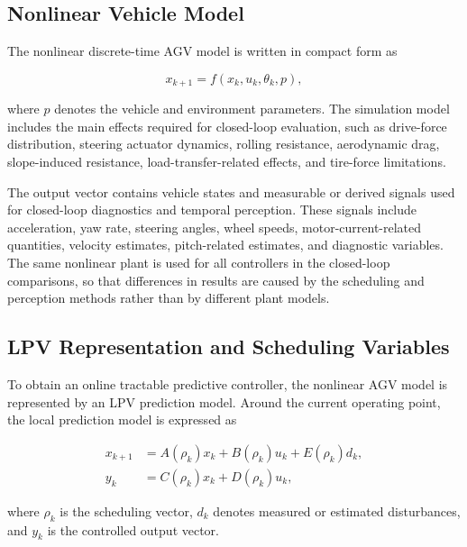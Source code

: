 \documentclass{ieeeaccess}
\begin{document}
\subsection{Nonlinear Vehicle Model}



The nonlinear discrete-time AGV model is written in compact form as

\begin{equation}
x_{k+1}=f(x_k,u_k,\theta_k,p),
\label{eq:nonlinear_model}
\end{equation}

where $p$ denotes the vehicle and environment parameters. The simulation model includes the main effects required for closed-loop evaluation, such as drive-force distribution, steering actuator dynamics, rolling resistance, aerodynamic drag, slope-induced resistance, load-transfer-related effects, and tire-force limitations.



The output vector contains vehicle states and measurable or derived signals used for closed-loop diagnostics and temporal perception. These signals include acceleration, yaw rate, steering angles, wheel speeds, motor-current-related quantities, velocity estimates, pitch-related estimates, and diagnostic variables. The same nonlinear plant is used for all controllers in the closed-loop comparisons, so that differences in results are caused by the scheduling and perception methods rather than by different plant models.



\subsection{LPV Representation and Scheduling Variables}



To obtain an online tractable predictive controller, the nonlinear AGV model is represented by an LPV prediction model. Around the current operating point, the local prediction model is expressed as

\begin{align}
x_{k+1} &= A(\rho_k)x_k + B(\rho_k)u_k + E(\rho_k)d_k, \label{eq:lpv_state}\\
y_k &= C(\rho_k)x_k + D(\rho_k)u_k,
\label{eq:lpv_output}
\end{align}

where $\rho_k$ is the scheduling vector, $d_k$ denotes measured or estimated disturbances, and $y_k$ is the controlled output vector.
\end{document}
